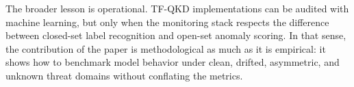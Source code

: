 The broader lesson is operational. TF-QKD implementations can be audited with machine learning, but only when the monitoring stack respects the difference between closed-set label recognition and open-set anomaly scoring. In that sense, the contribution of the paper is methodological as much as it is empirical: it shows how to benchmark model behavior under clean, drifted, asymmetric, and unknown threat domains without conflating the metrics.






